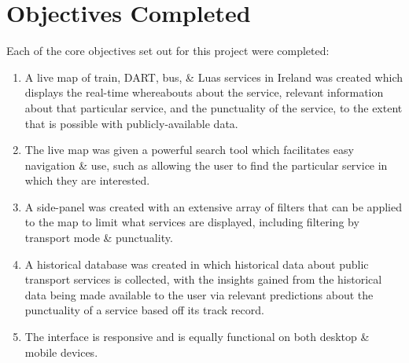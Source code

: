 \documentclass[a4paper,11pt]{report}
\begin{document}
\section{Objectives Completed}
Each of the core objectives set out for this project were completed:
\begin{enumerate}
    \item   A live map of train, DART, bus, \& Luas services in Ireland was created which displays the real-time whereabouts about the service, relevant information about that particular service, and the punctuality of the service, to the extent that is possible with publicly-available data.

    \item   The live map was given a powerful search tool which facilitates easy navigation \& use, such as allowing the user to find the particular service in which they are interested.

    \item   A side-panel was created with an extensive array of filters that can be applied to the map to limit what services are displayed, including filtering by transport mode \& punctuality.

    \item   A historical database was created in which historical data about public transport services is collected, with the insights gained from the historical data being made available to the user via relevant predictions about the punctuality of a service based off its track record.

    \item   The interface is responsive and is equally functional on both desktop \& mobile devices.
\end{enumerate}
\end{document}
